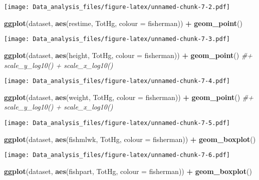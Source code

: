 \documentclass[12pt,]{article}
\newenvironment{Shaded}{\begin{snugshade}}{\end{snugshade}}
\newcommand{\KeywordTok}[1]{\textcolor[rgb]{0.13,0.29,0.53}{\textbf{#1}}}
\newcommand{\DataTypeTok}[1]{\textcolor[rgb]{0.13,0.29,0.53}{#1}}
\newcommand{\StringTok}[1]{\textcolor[rgb]{0.31,0.60,0.02}{#1}}
\newcommand{\CommentTok}[1]{\textcolor[rgb]{0.56,0.35,0.01}{\textit{#1}}}
\newcommand{\OperatorTok}[1]{\textcolor[rgb]{0.81,0.36,0.00}{\textbf{#1}}}
\newcommand{\NormalTok}[1]{#1}
\begin{document}
\texttt{[image: Data\_analysis\_files/figure-latex/unnamed-chunk-7-2.pdf]}

\begin{Shaded}
\begin{Highlighting}[]
\KeywordTok{ggplot}\NormalTok{(dataset, }\KeywordTok{aes}\NormalTok{(restime, TotHg, }\DataTypeTok{colour =}\NormalTok{ fisherman)) }\OperatorTok{+}\StringTok{ }\KeywordTok{geom_point}\NormalTok{()}
\end{Highlighting}
\end{Shaded}

\texttt{[image: Data\_analysis\_files/figure-latex/unnamed-chunk-7-3.pdf]}

\begin{Shaded}
\begin{Highlighting}[]
\KeywordTok{ggplot}\NormalTok{(dataset, }\KeywordTok{aes}\NormalTok{(height, TotHg, }\DataTypeTok{colour =}\NormalTok{ fisherman)) }\OperatorTok{+}\StringTok{ }\KeywordTok{geom_point}\NormalTok{() }\CommentTok{#+ scale_y_log10() + scale_x_log10() }
\end{Highlighting}
\end{Shaded}

\texttt{[image: Data\_analysis\_files/figure-latex/unnamed-chunk-7-4.pdf]}

\begin{Shaded}
\begin{Highlighting}[]
\KeywordTok{ggplot}\NormalTok{(dataset, }\KeywordTok{aes}\NormalTok{(weight, TotHg, }\DataTypeTok{colour =}\NormalTok{ fisherman)) }\OperatorTok{+}\StringTok{ }\KeywordTok{geom_point}\NormalTok{() }\CommentTok{#+ scale_y_log10() + scale_x_log10()}
\end{Highlighting}
\end{Shaded}

\texttt{[image: Data\_analysis\_files/figure-latex/unnamed-chunk-7-5.pdf]}

\begin{Shaded}
\begin{Highlighting}[]
\KeywordTok{ggplot}\NormalTok{(dataset, }\KeywordTok{aes}\NormalTok{(fishmlwk, TotHg, }\DataTypeTok{colour =}\NormalTok{ fisherman)) }\OperatorTok{+}\StringTok{ }\KeywordTok{geom_boxplot}\NormalTok{()}
\end{Highlighting}
\end{Shaded}

\texttt{[image: Data\_analysis\_files/figure-latex/unnamed-chunk-7-6.pdf]}

\begin{Shaded}
\begin{Highlighting}[]
\KeywordTok{ggplot}\NormalTok{(dataset, }\KeywordTok{aes}\NormalTok{(fishpart, TotHg, }\DataTypeTok{colour =}\NormalTok{ fisherman)) }\OperatorTok{+}\StringTok{ }\KeywordTok{geom_boxplot}\NormalTok{()}
\end{Highlighting}
\end{Shaded}
\end{document}
